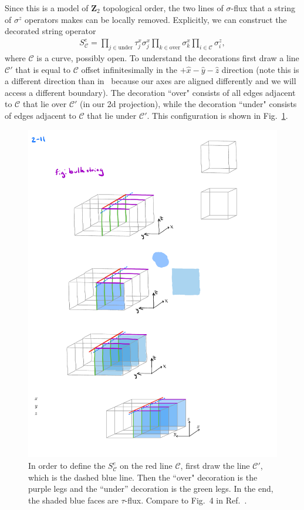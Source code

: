 \documentclass[twocolumn, longbibliography]{revtex4-2}
\newcommand{\C}{\mathcal{C}}
\begin{document}
Since this is a model of $\mathbf{Z}_2$ topological order, the two lines of $\sigma$-flux that a string of $\sigma^z$ operators makes can be locally removed. Explicitly, we can construct the decorated string operator
\begin{align}
S^e_\mathcal{C} = \prod_{j\in\text{under}} \tau^x_j \sigma^x_j \prod_{k\in\text{over}} \sigma^x_k \prod_{i\in\mathcal{C}}\sigma^z_i,
\end{align}
where $\mathcal{C}$ is a curve, possibly open. To understand the decorations first draw a line $\mathcal{C}'$ that is equal to $\mathcal{C}$ offset infinitesimally in the $+\hat{x}-\hat{y}-\hat{z}$ direction (note this is a different direction than in~\cite{BurnellSoluble} because our axes are aligned differently and we will access a different boundary). The decoration ``over" consists of all edges adjacent to $\C$ that lie over $\C'$ (in our 2d projection), while the decoration ``under" consists of edges adjacent to $\C$ that lie under $\C'$. This configuration is shown in Fig.~\ref{fig:bulkstring}. 
\begin{figure}
\centering
\includegraphics{bulkstring}
\caption{In order to define the $S_\C^e$ on the red line $\C$, first draw the line $\C'$, which is the dashed blue line. Then the ``over" decoration is the purple legs and the ``under'' decoration is the green legs. In the end, the shaded blue faces are $\tau$-flux. Compare to Fig.~4 in Ref.~\cite{BurnellSoluble}.}
\label{fig:bulkstring}
\end{figure}
\end{document}
